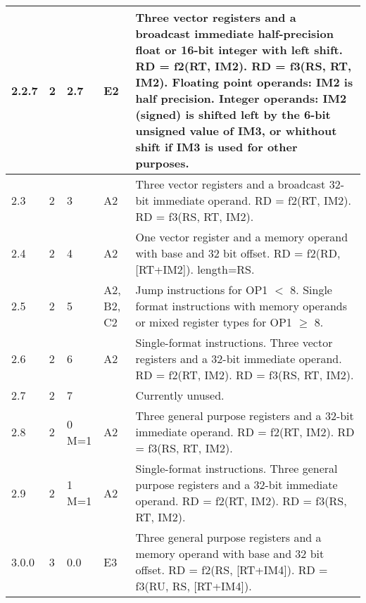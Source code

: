\documentclass[forwardcom.tex]{subfiles}
\begin{document}
\begin{longtable} {|p{10mm}|p{6mm}|p{9mm}|p{7mm}|p{80mm}|}
\hline
2.2.7 & 2 & 2.7 & E2 & Three vector registers and a broadcast immediate half-precision float or 16-bit integer with left shift.\newline 
RD = f2(RT, IM2). \newline 
RD = f3(RS, RT, IM2).\newline
Floating point operands: IM2 is half precision.
Integer operands: IM2 (signed) is shifted left by the 6-bit unsigned value of IM3, or whithout shift if IM3 is used for other purposes. \\

\hline
2.3 & 2 & 3 & A2 & Three vector registers and a broadcast 32-bit immediate operand.\newline 
RD = f2(RT, IM2). \newline 
RD = f3(RS, RT, IM2).\\

\hline
2.4 & 2 & 4 & A2 & One vector register and a memory operand with base and 32 bit offset.\newline
RD = f2(RD, [RT+IM2]). length=RS.\\

\hline
2.5 & 2 & 5 & A2, B2, C2 & Jump instructions for OP1 $<$ 8. Single format instructions with memory operands or mixed register types for OP1 $\geq$ 8.\\

\hline
2.6 & 2 & 6 & A2 & Single-format instructions. Three vector registers and a 32-bit immediate operand.\newline 
RD = f2(RT, IM2). \newline 
RD = f3(RS, RT, IM2).\\

\hline
2.7 & 2 & 7 &  & Currently unused.\\

\hline
2.8 & 2 & 0 M=1 & A2 & Three general purpose registers and a 32-bit immediate operand.\newline 
RD = f2(RT, IM2). \newline 
RD = f3(RS, RT, IM2).\\

\hline
2.9 & 2 & 1 M=1 & A2 & Single-format instructions. Three general purpose registers and a 32-bit immediate operand.\newline 
RD = f2(RT, IM2). \newline 
RD = f3(RS, RT, IM2).\\


\hline
3.0.0 & 3 & 0.0  & E3 & Three general purpose registers and a memory operand with base and 32 bit offset.\newline 
RD = f2(RS, [RT+IM4]). \newline 
RD = f3(RU, RS, [RT+IM4]).\\


\end{longtable}
\end{document}

